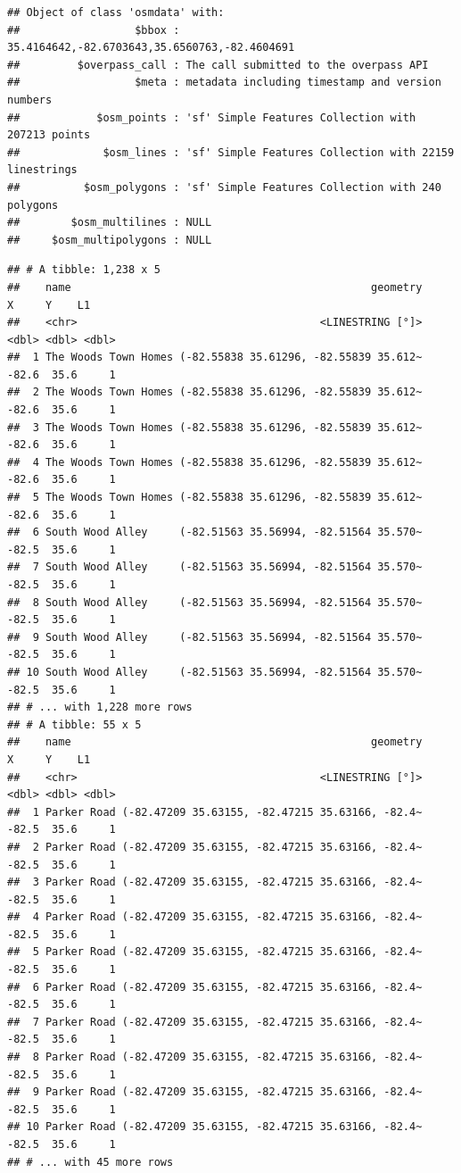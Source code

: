 \documentclass[
]{article}
\begin{document}
\begin{verbatim}
## Object of class 'osmdata' with:
##                  $bbox : 35.4164642,-82.6703643,35.6560763,-82.4604691
##         $overpass_call : The call submitted to the overpass API
##                  $meta : metadata including timestamp and version numbers
##            $osm_points : 'sf' Simple Features Collection with 207213 points
##             $osm_lines : 'sf' Simple Features Collection with 22159 linestrings
##          $osm_polygons : 'sf' Simple Features Collection with 240 polygons
##        $osm_multilines : NULL
##     $osm_multipolygons : NULL
\end{verbatim}

\begin{verbatim}
## # A tibble: 1,238 x 5
##    name                                               geometry     X     Y    L1
##    <chr>                                      <LINESTRING [°]> <dbl> <dbl> <dbl>
##  1 The Woods Town Homes (-82.55838 35.61296, -82.55839 35.612~ -82.6  35.6     1
##  2 The Woods Town Homes (-82.55838 35.61296, -82.55839 35.612~ -82.6  35.6     1
##  3 The Woods Town Homes (-82.55838 35.61296, -82.55839 35.612~ -82.6  35.6     1
##  4 The Woods Town Homes (-82.55838 35.61296, -82.55839 35.612~ -82.6  35.6     1
##  5 The Woods Town Homes (-82.55838 35.61296, -82.55839 35.612~ -82.6  35.6     1
##  6 South Wood Alley     (-82.51563 35.56994, -82.51564 35.570~ -82.5  35.6     1
##  7 South Wood Alley     (-82.51563 35.56994, -82.51564 35.570~ -82.5  35.6     1
##  8 South Wood Alley     (-82.51563 35.56994, -82.51564 35.570~ -82.5  35.6     1
##  9 South Wood Alley     (-82.51563 35.56994, -82.51564 35.570~ -82.5  35.6     1
## 10 South Wood Alley     (-82.51563 35.56994, -82.51564 35.570~ -82.5  35.6     1
## # ... with 1,228 more rows
## # A tibble: 55 x 5
##    name                                               geometry     X     Y    L1
##    <chr>                                      <LINESTRING [°]> <dbl> <dbl> <dbl>
##  1 Parker Road (-82.47209 35.63155, -82.47215 35.63166, -82.4~ -82.5  35.6     1
##  2 Parker Road (-82.47209 35.63155, -82.47215 35.63166, -82.4~ -82.5  35.6     1
##  3 Parker Road (-82.47209 35.63155, -82.47215 35.63166, -82.4~ -82.5  35.6     1
##  4 Parker Road (-82.47209 35.63155, -82.47215 35.63166, -82.4~ -82.5  35.6     1
##  5 Parker Road (-82.47209 35.63155, -82.47215 35.63166, -82.4~ -82.5  35.6     1
##  6 Parker Road (-82.47209 35.63155, -82.47215 35.63166, -82.4~ -82.5  35.6     1
##  7 Parker Road (-82.47209 35.63155, -82.47215 35.63166, -82.4~ -82.5  35.6     1
##  8 Parker Road (-82.47209 35.63155, -82.47215 35.63166, -82.4~ -82.5  35.6     1
##  9 Parker Road (-82.47209 35.63155, -82.47215 35.63166, -82.4~ -82.5  35.6     1
## 10 Parker Road (-82.47209 35.63155, -82.47215 35.63166, -82.4~ -82.5  35.6     1
## # ... with 45 more rows
\end{verbatim}
\end{document}
